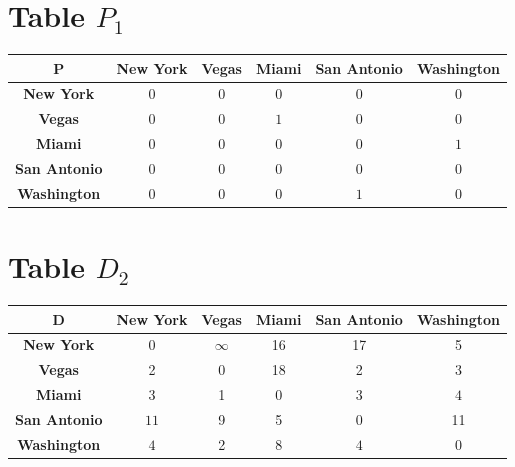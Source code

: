 \documentclass{article}
\begin{document}
\section{Table $P_{1}$}
\begin{center}
    \begin{tabular}{|c||c|c|c|c|c|}
        \hline
        \textbf{P} & \textbf{New York} & \textbf{Vegas} & \textbf{Miami} & \textbf{San Antonio} & \textbf{Washington} \\
        \hline
        \hline
        \textbf{New York}& 0 & 0 & 0 & 0 & 0 \\
        \hline
        \textbf{Vegas}& 0 & 0 & \cellcolor[HTML]{D74894}$1$ & 0 & 0 \\
        \hline
        \textbf{Miami}& 0 & 0 & 0 & 0 & \cellcolor[HTML]{D74894}$1$ \\
        \hline
        \textbf{San Antonio}& 0 & 0 & 0 & 0 & 0 \\
        \hline
        \textbf{Washington}& 0 & 0 & 0 & \cellcolor[HTML]{D74894}$1$ & 0 \\
        \hline
    \end{tabular}
\end{center}


\section{Table $D_{2}$}
\begin{center}
    \begin{tabular}{|c||c|c|c|c|c|}
        \hline
        \textbf{D} & \textbf{New York} & \textbf{Vegas} & \textbf{Miami} & \textbf{San Antonio} & \textbf{Washington} \\
        \hline
        \hline
        \textbf{New York}& 0 & $\infty$ & 16 & 17 & 5 \\
        \hline
        \textbf{Vegas}& 2 & 0 & 18 & 2 & 3 \\
        \hline
        \textbf{Miami}& \cellcolor[HTML]{D74894}$3$ & 1 & 0 & \cellcolor[HTML]{D74894}$3$ & \cellcolor[HTML]{D74894}$4$ \\
        \hline
        \textbf{San Antonio}& \cellcolor[HTML]{D74894}$11$ & 9 & 5 & 0 & 11 \\
        \hline
        \textbf{Washington}& \cellcolor[HTML]{D74894}$4$ & 2 & 8 & \cellcolor[HTML]{D74894}$4$ & 0 \\
        \hline
    \end{tabular}
\end{center}
\end{document}
